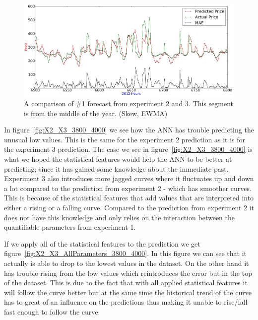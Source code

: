 \begin{figure}[H]
\centering
\includegraphics[width=\linewidth,natwidth=898,natheight=587]{billeder/PriceExperimentalAnalysis/X3_Nr1_Best_skew_historical.png}
\caption{A comparison of \#1 forecast from experiment 2 and 3. This segment is from the middle of the year. (Skew, EWMA)}
\label{fig:X3_Best_With_MAE}
\end{figure}

In figure~\ref{fig:X2_X3_3800_4000} we see how the ANN has trouble predicting the unusual low values. This is the same for the experiment 2 prediction as it is for the experiment 3 prediction. The case we see in figure~\ref{fig:X2_X3_3800_4000} is what we hoped the statistical features would help the ANN to be better at predicting; since it has gained some knowledge about the immediate past. Experiment 3 also introduces more jagged curves where it fluctuates up and down a lot compared to the prediction from experiment 2 - which has smoother curves. This is because of the statistical features that add values that are interpreted into either a rising or a falling curve. Compared to the prediction from experiment 2 it does not have this knowledge and only relies on the interaction between the quantifiable parameters from experiment 1.

If we apply all of the statistical features to the prediction we get figure~\ref{fig:X2_X3_AllParameters_3800_4000}. In this figure we can see that it actually is able to drop to the lowest values in the dataset. On the other hand it has trouble rising from the low values which reintroduces the error but in the top of the dataset. This is due to the fact that with all applied statistical features it will follow the curve better but at the same time the historical trend of the curve has to great of an influence on the predictions thus making it unable to rise/fall fast enough to follow the curve.

